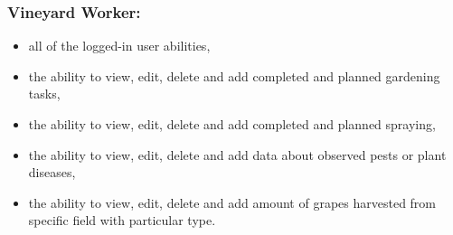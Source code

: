 \subsubsection{Vineyard Worker:}
\begin{itemize}
	\item all of the logged-in user abilities,
	\item the ability to view, edit, delete and add completed and planned gardening tasks,
	\item the ability to view, edit, delete and add completed and planned spraying,
	\item the ability to view, edit, delete and add data about observed pests or plant diseases,
	\item the ability to view, edit, delete and add amount of grapes harvested from specific field with particular type.
\end{itemize}
